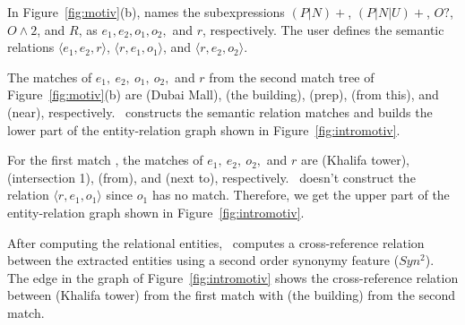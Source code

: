 %
In Figure~\ref{fig:motiv}(b), \framework names the subexpressions 
$(P|N)+$, $(P|N|U)+$, $O?$, $O\wedge 2$, and $R$, 
as $e_1, e_2, o_1, o_2,$ and $r$, respectively. 
The user defines the semantic relations
$\langle e_1, e_2, r\rangle$, 
$\langle r, e_1, o_1\rangle$, and 
$\langle r,e_2,o_2\rangle$.

The matches of $e_1,~e_2,~o_1,~o_2,$ and $r$ from the second match tree 
of Figure~\ref{fig:motiv}(b) are (Dubai Mall), 
(the building), (prep), (from this), 
and (near), respectively. 
\framework~constructs the semantic relation matches and builds the lower part of the 
entity-relation graph shown in Figure~\ref{fig:intromotiv}.

For the first match ,
the matches of $e_1,~e_2,~o_2,$ and $r$ are 
(Khalifa tower), (intersection 1), 
(from), and (next to), respectively. 
\framework~doesn't construct the relation $\langle r, e_1, o_1\rangle$ 
since $o_1$ has no match. 
Therefore, we get the upper part of the entity-relation graph shown 
in Figure~\ref{fig:intromotiv}.

After computing the relational entities, 
\framework~computes a cross-reference relation between the extracted entities
using a second order synonymy feature ($Syn^2$).
The  edge in the 
graph of Figure~\ref{fig:intromotiv} shows the cross-reference relation 
between (Khalifa tower) from the first match 
with (the building) from the second match.